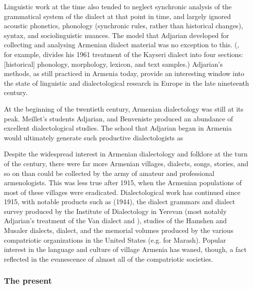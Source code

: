 Linguistic work at the time also tended to neglect synchronic analysis of the grammatical system of the dialect at that point in time, and largely ignored acoustic phonetics, phonology (synchronic rules, rather than historical changes), syntax, and sociolinguistic nuances. The model that Adjarian developed for collecting and analysing Armenian dialect material was no exception to this. (, for example, divides his 1961 treatment of the Kayseri dialect into four sections: [historical] phonology, morphology, lexicon, and text samples.) Adjarian’s methods, as still practiced in Armenia today, provide an interesting window into the state of linguistic and dialectological research in Europe in the late nineteenth century.


At the beginning of the twentieth century, Armenian dialectology was still at its peak. Meillet’s students Adjarian,  and Benveniste produced an abundance of excellent dialectological studies. The school that Adjarian began in Armenia would ultimately generate such productive dialectologists as 


Despite the widespread interest in Armenian dialectology and folklore at the turn of the century, there were far more Armenian villages, dialects, songs, stories, and so on than could be collected by the army of amateur and professional armenologists. This was less true after 1915, when the Armenian populations of most of these villages were eradicated. Dialectological work has continued since 1915, with notable products such as  (1944), the dialect grammars and dialect survey produced by the Institute of Dialectology in Yerevan (most notably Adjarian’s  treatment of the Van dialect and ),  studies of the Hamshen and Musaler dialects,  dialect, and the memorial volumes produced by the various compatriotic organizations in the United States (e.g.  for Marash). Popular interest in the language and culture of village Armenia has waned, though, a fact reflected in the evanescence of almost all of the compatriotic societies.

\subsubsection{The present}

